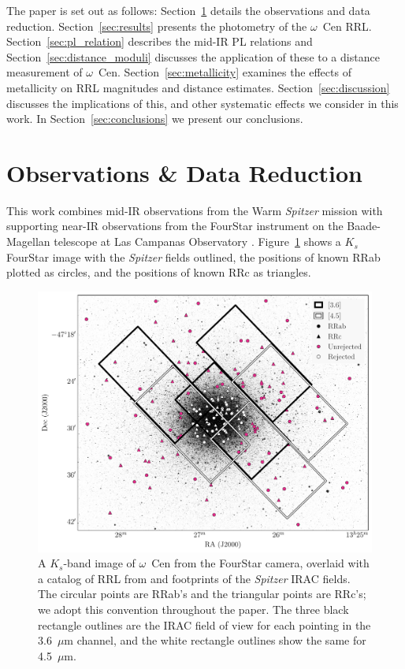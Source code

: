\documentclass[a4paper,fleqn,usenatbib]{mnras}
\begin{document}
%
The paper is set out as follows: Section~\ref{sec:observations} details the observations and data reduction. Section~\ref{sec:results} presents the photometry of the $\omega$~Cen RRL. Section~\ref{sec:pl_relation} describes the mid-IR PL relations and Section~\ref{sec:distance_moduli} discusses the application of these to a distance measurement of  $\omega$~Cen. Section~\ref{sec:metallicity} examines the effects of metallicity on RRL magnitudes and distance estimates. Section~\ref{sec:discussion} discusses the implications of this, and other systematic effects we consider in this work. In Section~\ref{sec:conclusions} we present our conclusions.

\section{Observations \& Data Reduction}
\label{sec:observations}
This work combines mid-IR observations from the Warm {\it Spitzer} mission \citep[][PID 90002]{2012sptz.prop90002F} with supporting near-IR observations from the FourStar instrument on the Baade-Magellan telescope at Las Campanas Observatory \citep{2013PASP..125..654P}. Figure~\ref{fig:omegaCen_fields} shows a $K_s$ FourStar image with the {\it Spitzer} fields outlined, the positions of known RRab plotted as circles, and the positions of known RRc as triangles.

\begin{figure}
\begin{center}
\includegraphics[width=160mm, trim=1cm 0 1cm 0]{reworked_fitting_code/final_plots/omegacen_coverage_map_new.pdf}
\caption{A $K_s$-band image of $\omega$~Cen from the FourStar camera, overlaid with a catalog of RRL from \citet{2004A&A...424.1101K} and footprints of the {\it Spitzer} IRAC fields. The circular points are RRab's and the triangular points are RRc's; we adopt this convention throughout the paper. The three black rectangle outlines are the IRAC field of view for each pointing in the 3.6~$\mu$m channel, and the white rectangle outlines show the same for 4.5~$\mu$m.} 
\label{fig:omegaCen_fields}
\end{center}
\end{figure}
\end{document}
